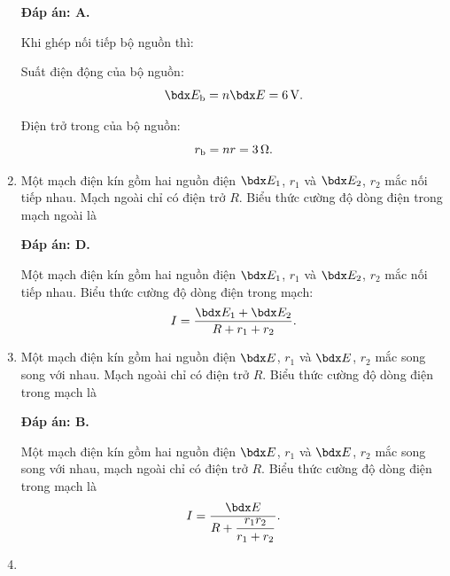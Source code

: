 \begin{enumerate}[label=\bfseries Câu \arabic*:]
{	}
	\loigiai
	{	\textbf{Đáp án: A.}
		
		Khi ghép nối tiếp bộ nguồn thì:
		
		Suất điện động của bộ nguồn:
		$$\calE_\text b= n \calE = \SI{6}{V}.$$
		
		Điện trở trong của bộ nguồn:
		$$r_\text b = nr = \SI{3}{\Omega}.$$
	}
	\item {}
	
	\cauhoi
	{Một mạch điện kín gồm hai nguồn điện $\calE_1$, $r_1$ và $\calE_2$, $r_2$ mắc nối tiếp nhau. Mạch ngoài chỉ có điện trở $R$. Biểu thức cường độ dòng điện trong mạch ngoài là
		
	}
	\loigiai
	{	\textbf{Đáp án: D.}
		
		Một mạch điện kín gồm hai nguồn điện $\calE_1$, $r_1$ và $\calE_2$, $r_2$ mắc nối tiếp nhau. Biểu thức cường độ dòng điện trong mạch:
		$$I=\dfrac{\calE_1 + \calE_2}{R + r_1 + r_2}.$$
	}
	\item {}
	
	\cauhoi
	{Một mạch điện kín gồm hai nguồn điện $\calE$, $r_1$ và $\calE$, $r_2$ mắc song song với nhau. Mạch ngoài chỉ có điện trở $R$. Biểu thức cường độ dòng điện trong mạch là
		
	}
	\loigiai
	{	\textbf{Đáp án: B.}
		
		Một mạch điện kín gồm hai nguồn điện $\calE$, $r_1$ và $\calE$, $r_2$ mắc song song với nhau, mạch ngoài chỉ có điện trở $R$. Biểu thức cường độ dòng điện trong mạch là
		$$I=\dfrac{\calE}{R + \dfrac{r_1 r_2}{r_1 + r_2}}.$$
	}
	\item {}
	

\end{enumerate}
